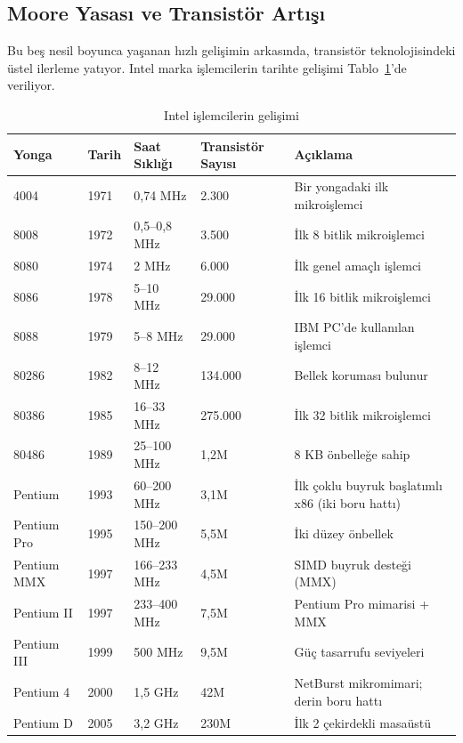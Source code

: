 \subsection{Moore Yasası ve Transistör Artışı}
\label{sec:moore-yasasi}

Bu beş nesil boyunca yaşanan hızlı gelişimin arkasında, transistör teknolojisindeki üstel ilerleme yatıyor. Intel marka işlemcilerin tarihte gelişimi Tablo~\ref{tab:intel-gelisim}'de veriliyor.

\begin{table}[ht!]
\centering
\caption{Intel işlemcilerin gelişimi}
\label{tab:intel-gelisim}
\footnotesize
\begin{tabular}{llllp{5cm}}
\toprule
\textbf{Yonga} & \textbf{Tarih} & \textbf{Saat Sıklığı} & \textbf{Transistör Sayısı} & \textbf{Açıklama} \\
\midrule
4004       & 1971 & 0,74 MHz   & 2.300   & Bir yongadaki ilk mikroişlemci \\
8008       & 1972 & 0,5--0,8 MHz & 3.500   & İlk 8 bitlik mikroişlemci \\
8080       & 1974 & 2 MHz      & 6.000   & İlk genel amaçlı işlemci \\
8086       & 1978 & 5--10 MHz  & 29.000  & İlk 16 bitlik mikroişlemci \\
8088       & 1979 & 5--8 MHz   & 29.000  & IBM PC'de kullanılan işlemci \\
80286      & 1982 & 8--12 MHz  & 134.000 & Bellek koruması bulunur \\
80386      & 1985 & 16--33 MHz & 275.000 & İlk 32 bitlik mikroişlemci \\
80486      & 1989 & 25--100 MHz& 1,2M    & 8 KB önbelleğe sahip \\
Pentium    & 1993 & 60--200 MHz& 3,1M    & İlk çoklu buyruk başlatımlı x86 (iki boru hattı) \\
Pentium Pro& 1995 & 150--200 MHz& 5,5M   & İki düzey önbellek \\
Pentium MMX& 1997 & 166--233 MHz& 4,5M   & SIMD buyruk desteği (MMX) \\
Pentium II & 1997 & 233--400 MHz& 7,5M   & Pentium Pro mimarisi + MMX \\
Pentium III& 1999 & 500 MHz    & 9,5M    & Güç tasarrufu seviyeleri \\
Pentium 4  & 2000 & 1,5 GHz    & 42M     & NetBurst mikromimari; derin boru hattı \\
Pentium D  & 2005 & 3,2 GHz    & 230M    & İlk 2 çekirdekli masaüstü \\

\end{tabular}
\end{table}

